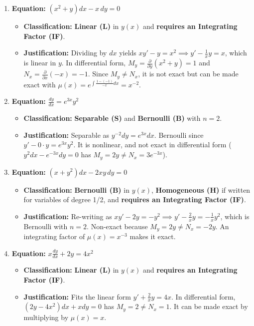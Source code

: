 \documentclass[11pt,letterpaper]{article}
\begin{document}
\begin{enumerate}[label=\textbf{\arabic*.}]
    \item \textbf{Equation:} $(x^2 + y)dx - x\,dy = 0$
    \begin{itemize}
        \item \textbf{Classification:} \textbf{Linear (L)} in $y(x)$ and \textbf{requires an Integrating Factor (IF)}.
        \item \textbf{Justification:} Dividing by $dx$ yields $x y' - y = x^2 \implies y' - \frac{1}{x}y = x$, which is linear in $y$. In differential form, $M_y = \frac{\partial}{\partial y}(x^2+y) = 1$ and $N_x = \frac{\partial}{\partial x}(-x) = -1$. Since $M_y \neq N_x$, it is not exact but can be made exact with $\mu(x) = e^{\int \frac{1 - (-1)}{-x} dx} = x^{-2}$.
    \end{itemize}

    \item \textbf{Equation:} $\frac{dy}{dx} = e^{3x} y^2$
    \begin{itemize}
        \item \textbf{Classification:} \textbf{Separable (S)} and \textbf{Bernoulli (B)} with $n = 2$.
        \item \textbf{Justification:} Separable as $y^{-2}dy = e^{3x}dx$. Bernoulli since $y' - 0\cdot y = e^{3x}y^2$. It is nonlinear, and not exact in differential form ($y^2 dx - e^{-3x}dy = 0$ has $M_y = 2y \neq N_x = 3e^{-3x}$).
    \end{itemize}

    \item \textbf{Equation:} $(x + y^2)dx - 2xy\,dy = 0$
    \begin{itemize}
        \item \textbf{Classification:} \textbf{Bernoulli (B)} in $y(x)$, \textbf{Homogeneous (H)} if written for variables of degree 1/2, and \textbf{requires an Integrating Factor (IF)}.
        \item \textbf{Justification:} Re-writing as $x y' - 2y = -y^2 \implies y' - \frac{2}{x}y = -\frac{1}{x}y^2$, which is Bernoulli with $n=2$. Non-exact because $M_y = 2y \neq N_x = -2y$. An integrating factor of $\mu(x) = x^{-3}$ makes it exact.
    \end{itemize}

    \item \textbf{Equation:} $x \frac{dy}{dx} + 2y = 4x^2$
    \begin{itemize}
        \item \textbf{Classification:} \textbf{Linear (L)} in $y(x)$ and \textbf{requires an Integrating Factor (IF)}.
        \item \textbf{Justification:} Fits the linear form $y' + \frac{2}{x}y = 4x$. In differential form, $(2y - 4x^2)dx + x dy = 0$ has $M_y = 2 \neq N_x = 1$. It can be made exact by multiplying by $\mu(x) = x$.
    \end{itemize}


\end{enumerate}
\end{document}

